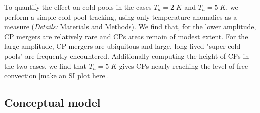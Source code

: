 \documentclass[draft,linenumbers]{agujournal2019}
\begin{document}
To quantify the effect on cold pools in the cases $T_a=2\;K$ and $T_a=5\;K$, we perform a simple cold pool tracking, using only temperature anomalies as a measure ({\it Details:} Materials and Methods).
We find that, for the lower amplitude, CP mergers are relatively rare and CPs areas remain of modest extent. 
For the large amplitude, CP mergers are ubiquitous and large, long-lived "super-cold pools" are frequently encountered. 
Additionally computing the height of CPs in the two cases, we find that $T_a=5\;K$ gives CPs nearly reaching the level of free convection [make an SI plot here]. 


\subsection{Conceptual model}
\end{document}
